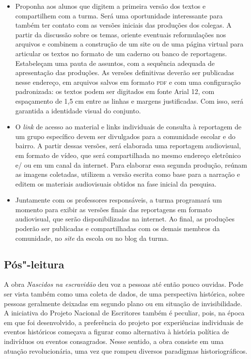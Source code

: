 \documentclass[12pt]{extarticle}
\begin{document}
\begin{itemize}
\item
  Proponha aos alunos que digitem a primeira versão dos textos e
  compartilhem com a turma. Será uma oportunidade interessante para
  também ter contato com as versões iniciais das produções dos colegas.
  A partir da discussão sobre os temas, oriente eventuais reformulações
  nos arquivos e combinem a construção de um site ou de uma página
  virtual para articular os textos no formato de um caderno ou banco de
  reportagens. Estabeleçam uma pauta de assuntos, com a sequência
  adequada de apresentação das produções. As versões definitivas deverão
  ser publicadas nesse endereço, em arquivos salvos em formato \textsc{pdf} e com
  uma configuração padronizada: os textos podem ser digitados em fonte
  Arial 12, com espaçamento de 1,5 cm entre as linhas e margens
  justificadas. Com isso, será garantida a identidade visual do
  conjunto.
\item
  O \emph{link} de acesso ao material e links individuais de consulta à
  reportagem de um grupo específico devem ser divulgados para a
  comunidade escolar e do bairro. A partir dessas versões, será
  elaborada uma reportagem audiovisual, em formato de vídeo, que será
  compartilhada no mesmo endereço eletrônico e/ ou em um canal da
  internet. Para elaborar essa segunda produção, reúnam as imagens
  coletadas, utilizem a versão escrita como base para a narração e
  editem os materiais audiovisuais obtidos na fase inicial da pesquisa.
\item
  Juntamente com os professores responsáveis, a turma programará um
  momento para exibir as versões finais das reportagens em formato
  audiovisual, que serão disponibilizadas na internet. Ao final, as
  produções poderão ser publicadas e compartilhadas com os demais
  membros da comunidade, no \emph{site} da escola ou no blog da turma.
\end{itemize}


\subsection{Pós"-leitura}

A obra \emph{Nascidos na escravidão} deu voz a pessoas até
então pouco ouvidas. Pode ser vista também como uma coleta de dados, de
uma perspectiva histórica, sobre pessoas geralmente deixadas em segundo
plano ou em situação de invisibilidade. A iniciativa do Projeto Nacional
de Escritores também é peculiar, pois, na época em que foi desenvolvido,
a preferência do projeto por experiências individuais de eventos
históricos começava a figurar como alternativa à história política de
indivíduos ou eventos consagrados. Nesse sentido, a obra consiste em uma
atuação revolucionária, uma vez que rompeu diversos paradigmas
historiográficos.
\end{document}
